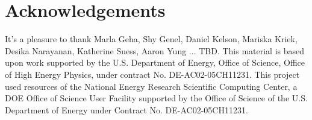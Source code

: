 \documentclass[12pt, letterpaper, preprint, comicneue]{aastex63}
\newcommand{\gr}{g{-}r}
\newcommand{\fnuv}{FUV{-}NUV}
\newcommand{\eda}{EDA}
\newcommand{\ch}[1]{#1}%
\newcommand{\chedit}[1]{{\color{orange}#1}}
\begin{document}
\begin{abstract}
    \chedit{
        The \eda, combined with a forward modeling, provides an effective
        approach for improving our understanding of dust in galaxies and
        probing hydrodynamical simulations. 
    } 
\end{abstract}



 





\section*{Acknowledgements}
It's a pleasure to thank
    Marla Geha, 
    Shy Genel, 
    Daniel Kelson, 
    Mariska Kriek, 
    Desika Narayanan,
    Katherine Suess, 
    Aaron Yung
    ... 
\ch{TBD}.
This material is based upon work supported by the U.S. Department of Energy,
Office of Science, Office of High Energy Physics, under contract No.
DE-AC02-05CH11231.  This project used resources of the National Energy Research
Scientific Computing Center, a DOE Office of Science User Facility supported by
the Office of Science of the U.S.  Department of Energy under Contract No.
DE-AC02-05CH11231. 
\end{document}
